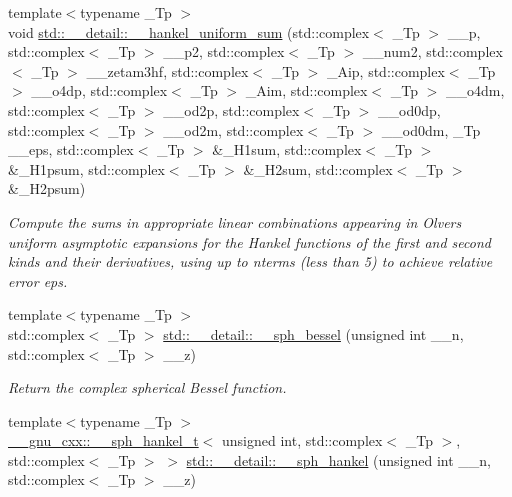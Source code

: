 \begin{DoxyCompactItemize}
{\footnotesize template$<$typename \+\_\+\+Tp $>$ }\\void \hyperlink{namespacestd_1_1____detail_a561dc02bc44b2dba376d6047289563c7}{std\+::\+\_\+\+\_\+detail\+::\+\_\+\+\_\+hankel\+\_\+uniform\+\_\+sum} (std\+::complex$<$ \+\_\+\+Tp $>$ \+\_\+\+\_\+p, std\+::complex$<$ \+\_\+\+Tp $>$ \+\_\+\+\_\+p2, std\+::complex$<$ \+\_\+\+Tp $>$ \+\_\+\+\_\+num2, std\+::complex$<$ \+\_\+\+Tp $>$ \+\_\+\+\_\+zetam3hf, std\+::complex$<$ \+\_\+\+Tp $>$ \+\_\+\+Aip, std\+::complex$<$ \+\_\+\+Tp $>$ \+\_\+\+\_\+o4dp, std\+::complex$<$ \+\_\+\+Tp $>$ \+\_\+\+Aim, std\+::complex$<$ \+\_\+\+Tp $>$ \+\_\+\+\_\+o4dm, std\+::complex$<$ \+\_\+\+Tp $>$ \+\_\+\+\_\+od2p, std\+::complex$<$ \+\_\+\+Tp $>$ \+\_\+\+\_\+od0dp, std\+::complex$<$ \+\_\+\+Tp $>$ \+\_\+\+\_\+od2m, std\+::complex$<$ \+\_\+\+Tp $>$ \+\_\+\+\_\+od0dm, \+\_\+\+Tp \+\_\+\+\_\+eps, std\+::complex$<$ \+\_\+\+Tp $>$ \&\+\_\+\+H1sum, std\+::complex$<$ \+\_\+\+Tp $>$ \&\+\_\+\+H1psum, std\+::complex$<$ \+\_\+\+Tp $>$ \&\+\_\+\+H2sum, std\+::complex$<$ \+\_\+\+Tp $>$ \&\+\_\+\+H2psum)
\begin{DoxyCompactList}\small\item\em Compute the sums in appropriate linear combinations appearing in Olver\textquotesingle{}s uniform asymptotic expansions for the Hankel functions of the first and second kinds and their derivatives, using up to nterms (less than 5) to achieve relative error {\ttfamily eps}. \end{DoxyCompactList}\item 
{\footnotesize template$<$typename \+\_\+\+Tp $>$ }\\std\+::complex$<$ \+\_\+\+Tp $>$ \hyperlink{namespacestd_1_1____detail_a28646bd01903e6da9871069a9363c593}{std\+::\+\_\+\+\_\+detail\+::\+\_\+\+\_\+sph\+\_\+bessel} (unsigned int \+\_\+\+\_\+n, std\+::complex$<$ \+\_\+\+Tp $>$ \+\_\+\+\_\+z)
\begin{DoxyCompactList}\small\item\em Return the complex spherical Bessel function. \end{DoxyCompactList}\item 
{\footnotesize template$<$typename \+\_\+\+Tp $>$ }\\\hyperlink{struct____gnu__cxx_1_1____sph__hankel__t}{\+\_\+\+\_\+gnu\+\_\+cxx\+::\+\_\+\+\_\+sph\+\_\+hankel\+\_\+t}$<$ unsigned int, std\+::complex$<$ \+\_\+\+Tp $>$, std\+::complex$<$ \+\_\+\+Tp $>$ $>$ \hyperlink{namespacestd_1_1____detail_a1babbc6df4e260ad0e828044c9f33ca1}{std\+::\+\_\+\+\_\+detail\+::\+\_\+\+\_\+sph\+\_\+hankel} (unsigned int \+\_\+\+\_\+n, std\+::complex$<$ \+\_\+\+Tp $>$ \+\_\+\+\_\+z)

\end{DoxyCompactItemize}
